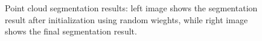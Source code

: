\documentclass[a4paper]{article}
\begin{document}
	\begin{figure}[thtbp]
	\setlength{\fboxrule}{0.0pt}      
	\caption{Point cloud segmentation results: left image shows the segmentation result after initialization using random wieghts, while right image shows the final segmentation result.}
\end{figure}
\end{document}
